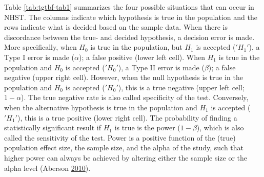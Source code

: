 \documentclass[a5paper]{book}
\begin{document}
Table \ref{tab:tgtbf-tab1} summarizes the four possible situations that
can occur in NHST. The columns indicate which hypothesis is true in the
population and the rows indicate what is decided based on the sample
data. When there is discordance between the true- and decided
hypothesis, a decision error is made. More specifically, when \(H_0\) is
true in the population, but \(H_1\) is accepted (\('H_1'\)), a Type I
error is made (\(\alpha\)); a false positive (lower left cell). When
\(H_1\) is true in the population and \(H_0\) is accepted (\('H_0'\)), a
Type II error is made (\(\beta\)); a false negative (upper right cell).
However, when the null hypothesis is true in the population and \(H_0\)
is accepted (\('H_0'\)), this is a true negative (upper left cell;
\(1-\alpha\)). The true negative rate is also called specificity of the
test. Conversely, when the alternative hypothesis is true in the
population and \(H_1\) is accepted (\('H_1'\)), this is a true positive
(lower right cell). The probability of finding a statistically
significant result if \(H_1\) is true is the power (\(1-\beta\)), which
is also called the sensitivity of the test. Power is a positive function
of the (true) population effect size, the sample size, and the alpha of
the study, such that higher power can always be achieved by altering
either the sample size or the alpha level (Aberson
\protect\hyperlink{ref-Aberson2010-xa}{2010}).

\begin{table}[!h]

\caption{\label{tab:tgtbf-tab1}Summary table of possible NHST results. Columns indicate the true situation in the population, rows indicate the decision based on a statistical test. The true positive probability is also called power and sensitivity, whereas the true negative rate is also called specificity.}
\centering
{}
\end{table}
\end{document}
